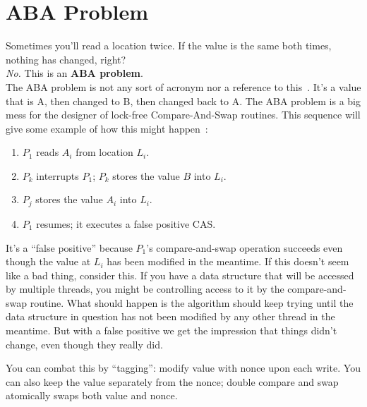 \section*{ABA Problem}
Sometimes you'll read a location twice.
If the value is the same both times, nothing has changed, right?\\[1em]

\emph{No.} This is an {\bf ABA problem}.\\[1em]

The ABA problem is not any sort of acronym nor a reference to this~\cite{abba}. It's a value that is A, then changed to B, then changed back to A. The ABA problem is a big mess for the designer of lock-free Compare-And-Swap routines. This sequence will give some example of how this might happen~\cite{abaproblem}:

\begin{enumerate}
	\item $P_{1}$ reads $A_{i}$ from location $L_{i}$.
	\item $P_{k}$ interrupts $P_{1}$; $P_{k}$ stores the value $B$ into $L_{i}$.
	\item $P_{j}$ stores the value $A_{i}$ into $L_{i}$.
	\item $P_{1}$ resumes; it executes a false positive CAS.
\end{enumerate} 

It's a ``false positive'' because $P_{1}$'s compare-and-swap operation succeeds even though the value at $L_{i}$ has been modified in the meantime. If this doesn't seem like a bad thing, consider this. If you have a data structure that will be accessed by multiple threads, you might be controlling access to it by the compare-and-swap routine. What should happen is the algorithm should keep trying until the data structure in question has not been modified by any other thread in the meantime. But with a false positive we get the impression that things didn't change, even though they really did.

You can combat this by ``tagging'': modify value with nonce upon each
write.  You can also keep the value separately from the nonce; double
compare and swap atomically swaps both value and nonce.





